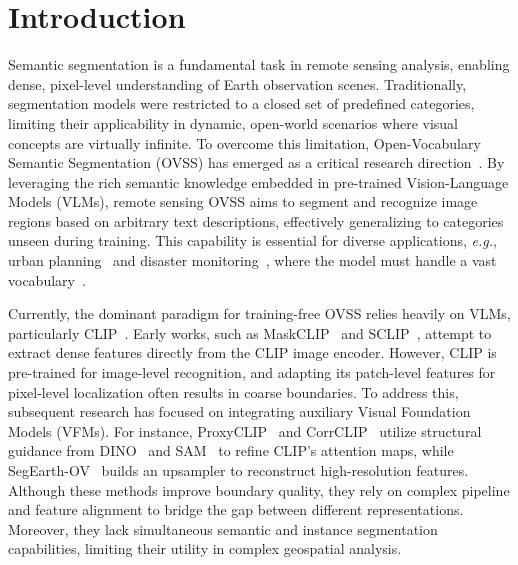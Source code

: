 \documentclass[twocolumn,switch,times]{article}
\begin{document}
\setcounter{footnote}{0}


\section{Introduction}
\label{sec:intro}

Semantic segmentation is a fundamental task in remote sensing analysis, enabling dense, pixel-level understanding of Earth observation scenes. Traditionally, segmentation models were restricted to a closed set of predefined categories, limiting their applicability in dynamic, open-world scenarios where visual concepts are virtually infinite. To overcome this limitation, Open-Vocabulary Semantic Segmentation (OVSS) has emerged as a critical research direction~\citep{li2025segearth}. By leveraging the rich semantic knowledge embedded in pre-trained Vision-Language Models (VLMs), remote sensing OVSS aims to segment and recognize image regions based on arbitrary text descriptions, effectively generalizing to categories unseen during training. This capability is essential for diverse applications, \textit{e.g.}, urban planning~\citep{li2024show} and disaster monitoring~\citep{wang2025disasterm3}, where the model must handle a vast vocabulary~\citep{li2025segearth, li2025annotation, li2026dynamicearth}.


Currently, the dominant paradigm for training-free OVSS relies heavily on VLMs, particularly CLIP~\citep{radford2021learning}. Early works, such as MaskCLIP~\citep{zhou2022extract} and SCLIP~\citep{wang2023sclip}, attempt to extract dense features directly from the CLIP image encoder. However, CLIP is pre-trained for image-level recognition, and adapting its patch-level features for pixel-level localization often results in coarse boundaries. To address this, subsequent research has focused on integrating auxiliary Visual Foundation Models (VFMs). For instance, ProxyCLIP~\citep{lan2025proxyclip} and CorrCLIP~\citep{zhang2025corrclip} utilize structural guidance from DINO~\citep{oquab2023dinov2} and SAM~\citep{kirillov2023segment} to refine CLIP's attention maps, while SegEarth-OV~\citep{li2025segearth, li2025annotation} builds an upsampler to reconstruct high-resolution features. 
Although these methods improve boundary quality, they rely on complex pipeline and feature alignment to bridge the gap between different representations. Moreover, they lack simultaneous semantic and instance segmentation capabilities, limiting their utility in complex geospatial analysis.
\end{document}
